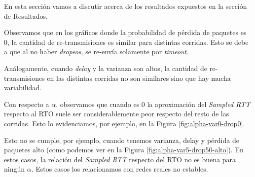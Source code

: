 
En esta sección vamos a discutir acerca de los resultados expuestos en la sección de Resultados.

Observamos que en los gráficos donde la probabilidad de pérdida de paquetes es 0, la cantidad de re-transmisiones es similar para distintas corridas. Esto se debe a que al no haber \emph{dropeos}, se re-envía solamente por \emph{timeout}.

Análogamente, cuando \emph{delay} y la varianza son altos, la cantidad de re-transmisiones en las distintas corridas no son similares sino que hay mucha variabilidad.

Con respecto a $\alpha$, observamos que cuando es 0 la aproximación del \emph{Sampled RTT} respecto al RTO suele ser considerablemente peor respecto del resto de las corridas. Esto lo evidenciamos, por ejemplo, en la Figura \ref{fig:alpha-var0-drop0}.

Esto no se cumple, por ejemplo, cuando tenemos varianza, delay y pérdida de paquetes alto (como podemos ver en la Figura \ref{fig:alpha-var5-drop50-alto}). En estos casos, la relación del \emph{Sampled RTT} respecto del RTO no es buena para ningún $\alpha$. Estos casos los relacionamos con redes reales no estables.